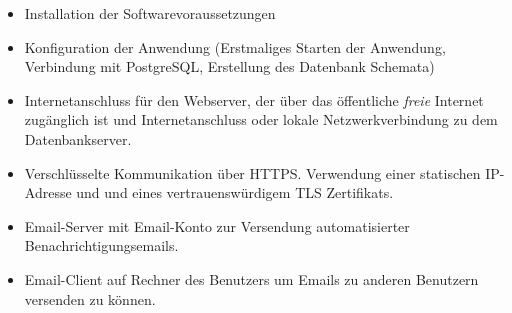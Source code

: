 \begin{itemize}
	\item Installation der Softwarevoraussetzungen

	\item Konfiguration der Anwendung (Erstmaliges Starten der Anwendung, Verbindung mit PostgreSQL, Erstellung des Datenbank Schemata)

	\item Internetanschluss für den Webserver, der über das öffentliche \textit{freie} Internet zugänglich ist und Internetanschluss oder lokale Netzwerkverbindung zu dem Datenbankserver.

	\item Verschlüsselte Kommunikation über HTTPS. Verwendung einer statischen IP-Adresse und und eines vertrauenswürdigem TLS Zertifikats.

	\item Email-Server mit Email-Konto zur Versendung automatisierter Benachrichtigungsemails.

	\item Email-Client auf Rechner des Benutzers um Emails zu anderen Benutzern versenden zu können.
\end{itemize}

